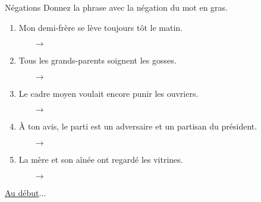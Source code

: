 \begin{frame}{Négations}
  Donnez la phrase avec la négation du mot \alert{en gras}.
  \begin{enumerate}
    \item Mon demi-frère se lève \alert{toujours} tôt le matin.
    \begin{itemize}
      \item[$\to$] 
    \end{itemize}
    \item \alert{Tous les grands-parents} soignent les gosses.
    \begin{itemize}
      \item[$\to$] 
    \end{itemize}
    \item Le cadre moyen voulait \alert{encore} punir les ouvriers.
    \begin{itemize}
      \item[$\to$] 
    \end{itemize}
    \item À ton avis, le parti est \alert{un adversaire et un partisan du président}.
    \begin{itemize}
      \item[$\to$] 
    \end{itemize}
    \item La mère et son aînée ont regardé \alert{les vitrines}.
    \begin{itemize}
      \item[$\to$] 
    \end{itemize}
  \end{enumerate}
  \vspace{0.25cm}
  \raggedleft\raggedleft\hyperlink{début}{Au début}...
\end{frame}